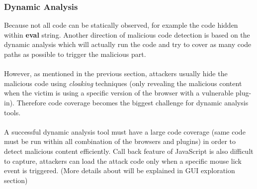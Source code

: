 \subsubsection{Dynamic Analysis}
Because not all code can be statically observed, for example the code hidden within \textbf{eval} string. Another direction of malicious code detection is based on the dynamic analysis which will actually run the code and try to cover as many code paths as possible to trigger the malicious part. \\ \\
However, as mentioned in the previous section, attackers usually hide the malicious code using \textit{cloaking}\cite{Cloaking} techniques (only revealing the malicious content when the victim is using a specific version of the browser with a vulnerable plug-in). Therefore code coverage becomes the biggest challenge for dynamic analysis tools. \\ \\
A successful dynamic analysis tool must have a large code coverage (same code must be run within all combination of the browsers and plugins) in order to detect malicious content efficiently. Call back feature of JavaScript is also difficult to capture, attackers can load the attack code only when a specific mouse lick event is triggered. (More details about will be explained in GUI exploration section)	 
